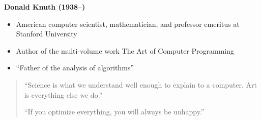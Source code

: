 {
\begin{frame}[plain,t]
\vfill
\hfill
\begin{minipage}{.42\textwidth}
\hspace{1em}\textbf{\large Donald Knuth (1938--)}
\begin{itemize}
\item American computer scientist, mathematician, and professor emeritus at Stanford University
\item Author of the multi-volume work The Art of Computer Programming
\item ``Father of the analysis of algorithms''
\end{itemize}
\end{minipage}

\bigskip

\begin{quote}
``Science is what we understand well enough to explain to a computer. Art is everything else we do.''

\medskip

``If you optimize everything, you will always be unhappy.''
\end{quote}
\vspace*{-4\baselineskip}\null
\end{frame}}


